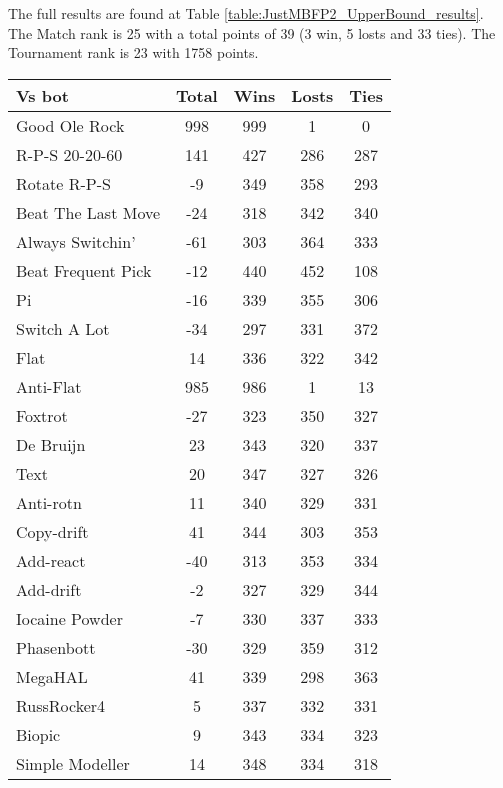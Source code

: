 The full results are found at Table \ref{table:JustMBFP2_UpperBound_results}. The Match rank is 25 with a total points of 39 (3 win, 5 losts and 33 ties). The Tournament rank is 23 with 1758 points.

\begin{table*}
    \caption{MBFP\textsubscript{1} and MBFP\textsubscript{2} Upper Bound results}
    \label{table:JustMBFP2_UpperBound_results}
    \centering
    \begin{tabular}{|l|c|c|c|c|}
        \hline
        \textbf{Vs bot} & \textbf{Total} & \textbf{Wins} & \textbf{Losts} & \textbf{Ties} \\ \hline
Good Ole Rock & 998 & 999 & 1 & 0 \\ \hline 
R-P-S 20-20-60 & 141 & 427 & 286 & 287 \\ \hline 
Rotate R-P-S & -9 & 349 & 358 & 293 \\ \hline 
Beat The Last Move & -24 & 318 & 342 & 340 \\ \hline 
Always Switchin' & -61 & 303 & 364 & 333 \\ \hline 
Beat Frequent Pick & -12 & 440 & 452 & 108 \\ \hline 
Pi & -16 & 339 & 355 & 306 \\ \hline 
Switch A Lot & -34 & 297 & 331 & 372 \\ \hline 
Flat & 14 & 336 & 322 & 342 \\ \hline 
Anti-Flat & 985 & 986 & 1 & 13 \\ \hline 
Foxtrot & -27 & 323 & 350 & 327 \\ \hline 
De Bruijn & 23 & 343 & 320 & 337 \\ \hline 
Text & 20 & 347 & 327 & 326 \\ \hline 
Anti-rotn & 11 & 340 & 329 & 331 \\ \hline 
Copy-drift & 41 & 344 & 303 & 353 \\ \hline 
Add-react & -40 & 313 & 353 & 334 \\ \hline 
Add-drift & -2 & 327 & 329 & 344 \\ \hline 
Iocaine Powder & -7 & 330 & 337 & 333 \\ \hline 
Phasenbott & -30 & 329 & 359 & 312 \\ \hline 
MegaHAL & 41 & 339 & 298 & 363 \\ \hline 
RussRocker4 & 5 & 337 & 332 & 331 \\ \hline 
Biopic & 9 & 343 & 334 & 323 \\ \hline 
Simple Modeller & 14 & 348 & 334 & 318 \\ \hline 

\end{tabular}
\end{table*}

